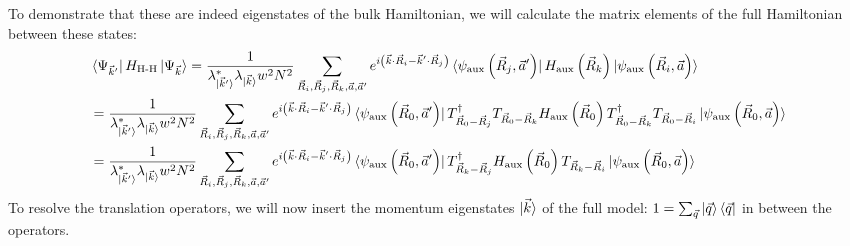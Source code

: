 \documentclass{report}
\numberwithin{equation}{section}
\begin{document}
To demonstrate that these are indeed eigenstates of the bulk Hamiltonian, we will calculate the matrix elements of the full Hamiltonian between these states:
\begin{equation}\begin{aligned}
	&\bra{\Psi_{\vec k^\prime}}H_\text{H-H} \ket{\Psi_{\vec k}} = \frac{1}{\lambda^*_{\ket{\vec k^\prime}} \lambda_{\ket{\vec k}} w^2 N^2}\sum_{\vec R_i, \vec R_j, \vec R_k, \vec a, \vec a^\prime}e^{i\left(\vec{k}\cdot\vec{R}_i - \vec{k}^\prime\cdot\vec{R}_j\right)} \bra{\psi_\text{aux}\left(\vec R_j, \vec a^\prime\right)} H_\text{aux}\left(\vec R_k\right) \ket{\psi_\text{aux}\left(\vec R_i, \vec a\right)}\\
	&= \frac{1}{\lambda^*_{\ket{\vec k^\prime}} \lambda_{\ket{\vec k}} w^2 N^2}\sum_{\vec R_i, \vec R_j, \vec R_k, \vec a, \vec a^\prime}e^{i\left(\vec{k}\cdot\vec{R}_i - \vec{k}^\prime\cdot\vec{R}_j\right)} \bra{\psi_\text{aux}\left(\vec R_0, \vec a^\prime\right)} T^\dagger_{\vec R_0 - \vec R_j} T_{\vec R_0 - \vec R_k} H_\text{aux}\left(\vec R_0\right) T^\dagger_{\vec R_0 - \vec R_k} T_{\vec R_0 - \vec R_i} \ket{\psi_\text{aux}\left(\vec R_0, \vec a\right)}\\
	&= \frac{1}{\lambda^*_{\ket{\vec k^\prime}} \lambda_{\ket{\vec k}} w^2 N^2}\sum_{\vec R_i, \vec R_j, \vec R_k, \vec a, \vec a^\prime}e^{i\left(\vec{k}\cdot\vec{R}_i - \vec{k}^\prime\cdot\vec{R}_j\right)} \bra{\psi_\text{aux}\left(\vec R_0, \vec a^\prime\right)} T^\dagger_{\vec R_k - \vec R_j} H_\text{aux}\left(\vec R_0\right) T_{\vec R_k - \vec R_i} \ket{\psi_\text{aux}\left(\vec R_0, \vec a\right)}
\end{aligned}\end{equation}
To resolve the translation operators, we will now insert the momentum eigenstates \(\ket{\vec k}\) of the full model: \(1 = \sum_{\vec q}\ket{\vec q}\bra{\vec q}\) in between the operators.
\end{document}
